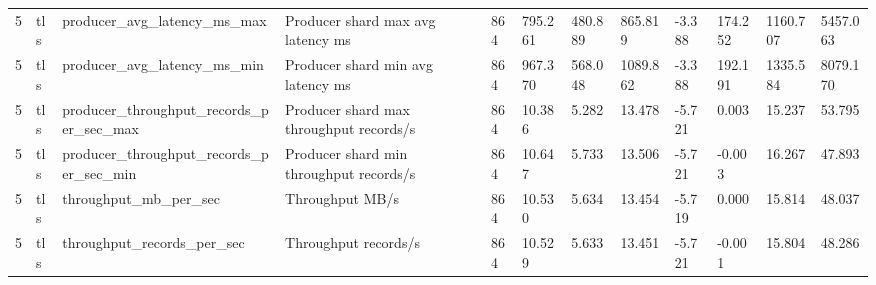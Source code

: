 \begin{longtable}{llllllllllll}
5 & tls & producer\_avg\_latency\_ms\_max & Producer shard max avg latency ms & 864 & 795.261 & 480.889 & 865.819 & -3.388 & 174.252 & 1160.707 & 5457.063 \\
5 & tls & producer\_avg\_latency\_ms\_min & Producer shard min avg latency ms & 864 & 967.370 & 568.048 & 1089.862 & -3.388 & 192.191 & 1335.584 & 8079.170 \\
5 & tls & producer\_throughput\_records\_per\_sec\_max & Producer shard max throughput records/s & 864 & 10.386 & 5.282 & 13.478 & -5.721 & 0.003 & 15.237 & 53.795 \\
5 & tls & producer\_throughput\_records\_per\_sec\_min & Producer shard min throughput records/s & 864 & 10.647 & 5.733 & 13.506 & -5.721 & -0.003 & 16.267 & 47.893 \\
5 & tls & throughput\_mb\_per\_sec & Throughput MB/s & 864 & 10.530 & 5.634 & 13.454 & -5.719 & 0.000 & 15.814 & 48.037 \\
5 & tls & throughput\_records\_per\_sec & Throughput records/s & 864 & 10.529 & 5.633 & 13.451 & -5.721 & -0.001 & 15.804 & 48.286 \\
\hline
\end{longtable}
